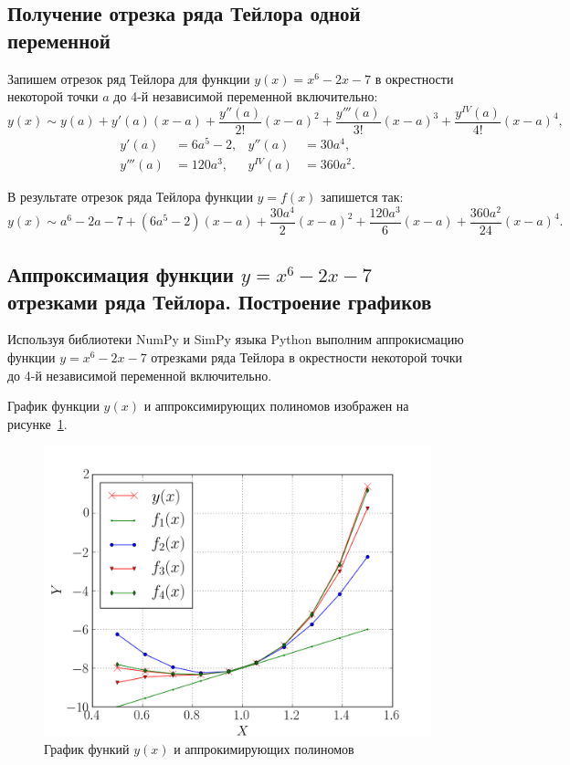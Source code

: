 \subsection{Получение отрезка ряда Тейлора одной переменной}

\setlength{\belowdisplayskip}{0pt}

Запишем отрезок ряд Тейлора для функции $y(x) = x^6 - 2x - 7$ в окрестности некоторой
точки $a$ до 4-й независимой переменной включительно:
\begin{equation*}
  y(x) \sim y(a) + y'(a)(x-a) + \dfrac{y''(a)}{2!}(x-a)^2 + \dfrac{y'''(a)}{3!}(x-a)^3 + \dfrac{y^{IV}(a)}{4!}(x-a)^4,
\end{equation*}
\begin{align*}
  y'(a)   &= 6a^5-2,    &y''(a)    &= 30a^4, \\
  y'''(a) &= 120a^3,    &y^{IV}(a) &= 360a^2.  
\end{align*}

\vspace{9mm}

В результате отрезок ряда Тейлора функции $y=f(x)$ запишется так:
\begin{equation*}
  y(x) \sim a^6-2a-7+(6a^5-2)(x-a) + \dfrac{30a^4}{2}(x-a)^2 +\dfrac{120a^3}{6}(x-a) + \dfrac{360a^2}{24}(x-a)^4.
\end{equation*}

\newpage


\subsection{Аппроксимация функции $y = x^6 - 2x - 7$ отрезками ряда Тейлора. Построение графиков}

Используя библиотеки NumPy и SimPy языка Python выполним аппрокисмацию функции $y = x^6 - 2x - 7$
отрезками ряда Тейлора в окрестности некоторой точки до 4-й независимой переменной включительно.

График функции $y(x)$ и аппроксимирующих полиномов изображен на рисунке~\ref{pic:taylor1}.
\begin{figure}[h!]
  \centering
  \includegraphics[width=\linewidth]{pic/taylor_1}
  \caption{График функий $y(x)$ и аппрокимирующих полиномов}
  \label{pic:taylor1}
\end{figure}

